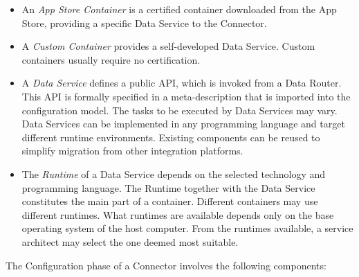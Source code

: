 \begin{itemize}
\begin{itemize}
	\end{itemize}

	\item An \textit{App Store Container} is a certified container downloaded from the App Store, providing a specific Data Service to the Connector.

	\item A \textit{Custom Container} provides a self-developed Data Service. Custom containers usually require no certification.

	\item A \textit{Data Service} defines a public API, which is invoked from a Data Router. This API is formally specified in a meta-description that is imported into the configuration model. The tasks to be executed by Data Services may vary. Data Services can be implemented in any programming language and target different runtime environments. Existing components can be reused to simplify migration from other integration platforms.

	\item The \textit{Runtime} of a Data Service depends on the selected technology and programming language. The Runtime together with the Data Service constitutes the main part of a container. Different containers may use different runtimes. What runtimes are available depends only on the base operating system of the host computer. From the runtimes available, a service architect may select the one deemed most suitable.

\end{itemize}

The Configuration phase of a Connector involves the following components:

